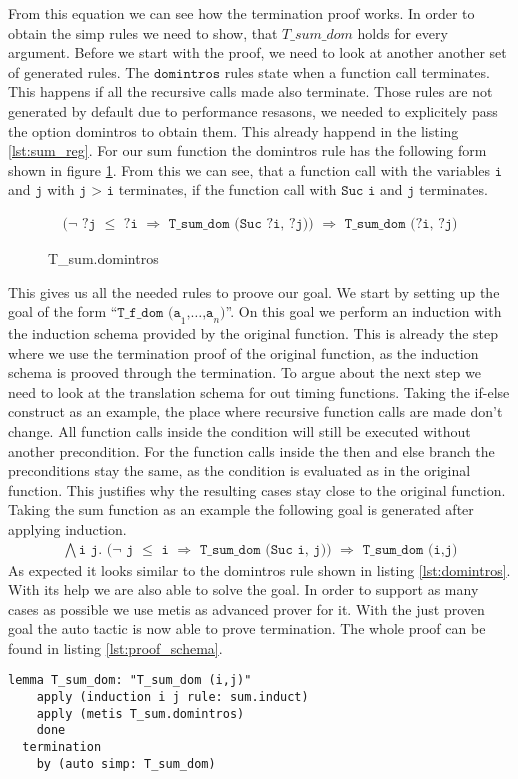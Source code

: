 From this equation we can see how the termination proof works.
In order to obtain the simp rules we need to show, that $T\_sum\_dom$ holds for every argument.
Before we start with the proof, we need to look at another another set of generated rules.
The $\texttt{domintros}$ rules state when a function call terminates.
This happens if all the recursive calls made also terminate.
Those rules are not generated by default due to performance resasons, we needed to explicitely pass the option domintros to obtain them.
This already happend in the listing \ref{lst:sum_reg}.
For our sum function the domintros rule has the following form shown in figure \ref{fig:domintros}.
From this we can see, that a function call with the variables $\texttt{i}$ and $\texttt{j}$ with $\texttt{j > i}$ terminates,
if the function call with $\texttt{Suc i}$ and $\texttt{j}$ terminates.
\begin{figure}[H]
\begin{align*}
  \texttt{($\lnot$ ?j $\le$ ?i $\Longrightarrow$ T\_sum\_dom (Suc ?i, ?j)) $\Longrightarrow$ T\_sum\_dom (?i, ?j)}
\end{align*}
\caption{T\_sum.domintros}
\label{fig:domintros}
\end{figure}

This gives us all the needed rules to proove our goal.
We start by setting up the goal of the form ``$\texttt{T\_f\_dom (a}_{1}\texttt{,}\dots\texttt{,a}_{n}\texttt{)}$''.
On this goal we perform an induction with the induction schema provided by the original function.
This is already the step where we use the termination proof of the original function,
as the induction schema is prooved through the termination.
To argue about the next step we need to look at the translation schema for out timing functions.
Taking the if-else construct as an example, the place where recursive function calls are made don't change.
All function calls inside the condition will still be executed without another precondition.
For the function calls inside the then and else branch the preconditions stay the same, as the condition is evaluated as in the original function.
This justifies why the resulting cases stay close to the original function.
Taking the sum function as an example the following goal is generated after applying induction.
\begin{align*}
  \texttt{$\bigwedge$i j. ($\lnot$ j $\le$ i $\Longrightarrow$ T\_sum\_dom (Suc i, j)) $\Longrightarrow$ T\_sum\_dom (i,j)}
\end{align*}
As expected it looks similar to the domintros rule shown in listing \ref{lst:domintros}.
With its help we are also able to solve the goal.
In order to support as many cases as possible we use metis as advanced prover for it.
With the just proven goal the auto tactic is now able to prove termination.
The whole proof can be found in listing \ref{lst:proof_schema}.
\begin{lstlisting}[language=isabelle,mathescape=true,label=lst:proof_schema,caption=Proof schema over dom with help of original function]
  lemma T_sum_dom: "T_sum_dom (i,j)"
    apply (induction i j rule: sum.induct)
    apply (metis T_sum.domintros)
    done
  termination
    by (auto simp: T_sum_dom)
\end{lstlisting}


